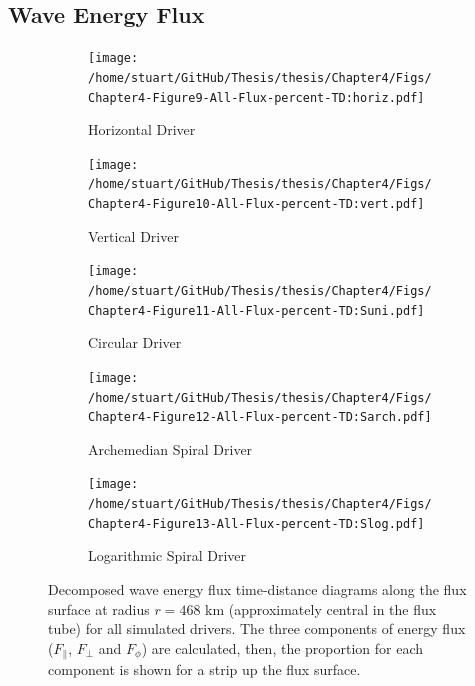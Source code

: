 \documentclass[a4paper,12pt,fourier,authoryear,custommargin]{Classes/PhDThesisPSnPDF}
\begin{document}
\subsection{Wave Energy Flux}\label{sec:energy_flux}



\begin{figure}
    \centering
    

    \begin{subfigure}[b]{0.9\columnwidth}
        \texttt{[image: /home/stuart/GitHub/Thesis/thesis/Chapter4/Figs/Chapter4-Figure9-All-Flux-percent-TD:horiz.pdf]}
        \caption{Horizontal Driver}
        \label{fig:All-Flux-percent-TD:horiz}
    \end{subfigure}

    \begin{subfigure}[b]{0.9\columnwidth}
        \texttt{[image: /home/stuart/GitHub/Thesis/thesis/Chapter4/Figs/Chapter4-Figure10-All-Flux-percent-TD:vert.pdf]}
        \caption{Vertical Driver}
        \label{fig:All-Flux-percent-TD:vert}
    \end{subfigure}
    \caption{}
    \label{fig:}
\end{figure}

\begin{figure}
    \centering
\ContinuedFloat
    

    \begin{subfigure}[b]{0.9\columnwidth}
        \texttt{[image: /home/stuart/GitHub/Thesis/thesis/Chapter4/Figs/Chapter4-Figure11-All-Flux-percent-TD:Suni.pdf]}
        \caption{Circular Driver}
        \label{fig:All-Flux-percent-TD:Suni}
    \end{subfigure}

    \begin{subfigure}[b]{0.9\columnwidth}
        \texttt{[image: /home/stuart/GitHub/Thesis/thesis/Chapter4/Figs/Chapter4-Figure12-All-Flux-percent-TD:Sarch.pdf]}
        \caption{Archemedian Spiral Driver}
        \label{fig:All-Flux-percent-TD:Sarch}
    \end{subfigure}
    \caption{}
    \label{fig:}
\end{figure}

\begin{figure}
    \centering
\ContinuedFloat
    

    \begin{subfigure}[b]{0.9\columnwidth}
        \texttt{[image: /home/stuart/GitHub/Thesis/thesis/Chapter4/Figs/Chapter4-Figure13-All-Flux-percent-TD:Slog.pdf]}
        \caption{Logarithmic Spiral Driver}
        \label{fig:All-Flux-percent-TD:Slog}
    \end{subfigure}
    \caption{Decomposed wave energy flux time-distance diagrams along the flux surface at radius $r = 468$ km (approximately central in the flux tube) for all simulated drivers. The three components of energy flux ($F_\parallel$, $F_\perp$ and $F_\phi$) are calculated, then, the proportion for each component is shown for a strip up the flux surface.}
    \label{fig:All-Flux-percent-TD}
\end{figure}
\end{document}
